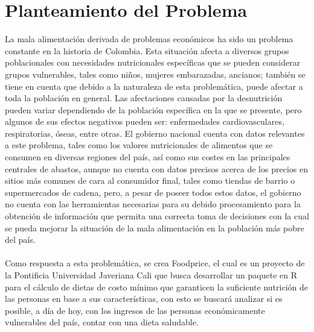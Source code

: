 

\section{Planteamiento del Problema}

\noindent La mala alimentaci\'on derivada de problemas econ\'omicos ha sido un problema constante en la historia de Colombia. \cite{RelacionEntreFactor} Esta situaci\'on afecta a diversos grupos poblacionales con necesidades nutricionales espec\'ificas que se pueden considerar grupos vulnerables, tales como ni\~{n}os, mujeres embarazadas, ancianos; tambi\'en se tiene en cuenta que debido a la naturaleza de esta problem\'atica, puede afectar a toda la poblaci\'on en general. Las afectaciones causadas por la desnutrici\'on pueden variar dependiendo de la poblaci\'on espec\'ifica en la que se presente, pero algunos de sus efectos negativos pueden ser: enfermedades cardiovasculares, respiratorias, \'oseas, entre otras.\cite{pelaezDesnutricionEnfermedad} El gobierno nacional cuenta con datos relevantes a este problema, tales como los valores nutricionales de alimentos que se consumen en diversas regiones del pa\'is, as\'i como sus costes en las principales centrales de abastos, aunque no cuenta con datos precisos acerca de los precios en sitios m\'as comunes de cara al consumidor final, tales como tiendas de barrio o supermercados de cadena, pero, a pesar de poseer todos estos datos, el gobierno no cuenta con las herramientas necesarias para su debido procesamiento para la obtenci\'on de informaci\'on que permita una correcta toma de decisiones con la cual se pueda mejorar la situaci\'on de la mala alimentaci\'on en la poblaci\'on m\'as pobre del pa\'is.
\\
\\
Como respuesta a esta problem\'atica, se crea Foodprice, el cual es un proyecto de la Pontificia Universidad Javeriana Cali que busca desarrollar un paquete en R para el c\'alculo de dietas de costo m\'inimo que garanticen la suficiente nutrici\'on de las personas en base a sus caracter\'isticas, con esto se buscar\'a analizar si es posible, a d\'ia de hoy, con los ingresos de las personas econ\'omicamente vulnerables del pa\'is, contar con una dieta saludable.
\\
\\
